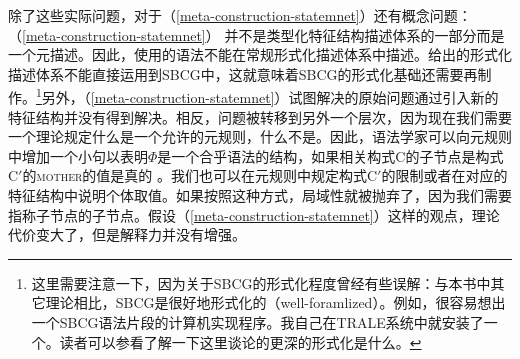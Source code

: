 除了这些实际问题，对于（\ref{meta-construction-statemnet}）还有概念问题：（\ref{meta-construction-statemnet}） 并不是类型化特征结构描述体系的一部分而是一个元描述。因此，使用\label{page-sbcg-formalization}的语法不能在常规形式化描述体系中描述。\citet{Richter2004a-u}给出的形式化描述体系不能直接运用到SBCG中，这就意味着SBCG的形式化基础还需要再制作。\footnote{
 这里需要注意一下，因为关于SBCG的形式化程度曾经有些误解：与本书中其它理论相比，SBCG是很好地形式化的（well-foramlized）。例如，很容易想出一个SBCG语法片段的计算机实现程序。我自己在TRALE系统中就安装了一个。读者可以参看\citet{Richter2004a-u}了解一下这里谈论的更深的形式化是什么。
}另外，（\ref{meta-construction-statemnet}）试图解决的原始问题通过引入新的特征结构并没有得到解决。相反，问题被转移到另外一个层次，因为现在我们需要一个理论规定什么是一个允许的元规则，什么不是。因此，语法学家可以向元规则中增加一个小句以表明$\Phi$是一个合乎语法的结构，如果相关构式C的子节点是构式C$'$的\textsc{mother}的值是真的 。我们也可以在元规则中规定构式C$'$的限制或者在对应的特征结构中说明个体取值。如果按照这种方式，局域性就被抛弃了，因为我们需要指称子节点的子节点。假设（\ref{meta-construction-statemnet}）这样的观点，理论代价变大了，但是解释力并没有增强。
